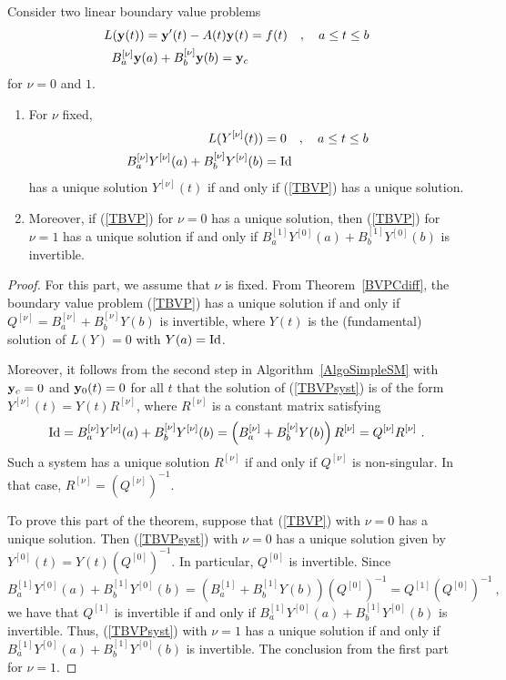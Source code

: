 \begin{prop}
Consider two linear boundary value problems
\begin{equation} \label{TBVP}
\begin{split}
L(\mathbf{y}(t)) = \mathbf{y}'(t) - A(t)\mathbf{y}(t) &= f(t) \quad ,
\quad a \leq t \leq b\\
B_a^{[\nu]}\mathbf{y}(a) + B_b^{[\nu]}\mathbf{y}(b) = \mathbf{y}_c
\end{split}
\end{equation} 
for $\nu =0$ and $1$.
\begin{enumerate}
\item For $\nu$ fixed,
\begin{equation} \label{TBVPsyst}
\begin{split}
L(Y^{[\nu]}(t)) &= 0 \quad , \quad a \leq t \leq b \\
B_a^{[\nu]}Y^{[\nu]}(a) + B_b^{[\nu]}Y^{[\nu]}(b) &= \operatorname{Id}
\end{split}
\end{equation}
has a unique solution $Y^{[\nu]}(t)$ if and only if (\ref{TBVP}) has a
unique solution.
\item Moreover, if (\ref{TBVP}) for $\nu =0$ has a unique
solution, then (\ref{TBVP}) for $\nu =1$ has a unique solution if and
only if $B_a^{[1]} Y^{[0]}(a) + B_b^{[1]}Y^{[0]}(b)$ is invertible.
\end{enumerate}
\label{BasicProp}
\end{prop}

\begin{proof}
For this part, we assume that $\nu$ is fixed.  From
Theorem~\ref{BVPCdiff}, the boundary value problem (\ref{TBVP}) 
has a unique solution if and only if
$Q^{[\nu]}= B_a^{[\nu]} +B_b^{[\nu]}Y(b)$ is invertible, where $Y(t)$
is the (fundamental) solution of $L(Y)=0$ with $Y(a) = \operatorname{Id}$.

Moreover, it follows from the second step in Algorithm~\ref{AlgoSimpleSM}
with $\mathbf{y}_c = 0$ and $\mathbf{y}_0(t) = 0$ for all $t$ that 
the solution of (\ref{TBVPsyst}) is of the form
$Y^{[\nu]}(t) = Y(t) R^{[\nu]}$, where $R^{[\nu]}$ is a constant
matrix satisfying
\[
\operatorname{Id} = B_a^{[\nu]}Y^{[\nu]}(a) + B_b^{[\nu]}Y^{[\nu]}(b) =
\left( B_a^{[\nu]} + B_b^{[\nu]} Y(b) \right)R^{[\nu]} = Q^{[\nu]}
R^{[\nu]} \ .
\]
Such a system has a unique solution $R^{[\nu]}$ if and only if
$Q^{[\nu]}$ is non-singular.  In that case,
$R^{[\nu]} = \left(Q^{[\nu]}\right)^{-1}$.

 To prove this part of the theorem, suppose that
(\ref{TBVP}) with $\nu =0$ has a unique solution.  Then
(\ref{TBVPsyst}) with $\nu=0$ has a unique solution given by
$Y^{[0]}(t) = Y(t) \left(Q^{[0]}\right)^{-1}$.  In particular, 
$Q^{[0]}$ is invertible.  Since
\[
B_a^{[1]}Y^{[0]}(a) + B_b^{[1]}Y^{[0]}(b)
= \left( B_a^{[1]} + B_b^{[1]} Y(b) \right)
\left(Q^{[0]}\right)^{-1} = Q^{[1]}\left(Q^{[0]}\right)^{-1} \ ,
\]
we have that $Q^{[1]}$ is invertible if and only if
$B_a^{[1]}Y^{[0]}(a) + B_b^{[1]}Y^{[0]}(b)$ is invertible.  Thus,
(\ref{TBVPsyst}) with $\nu=1$ has a unique solution if and only if
$B_a^{[1]}Y^{[0]}(a) + B_b^{[1]}Y^{[0]}(b)$ is invertible.  The
conclusion from the first part for $\nu =1$.
\end{proof}

